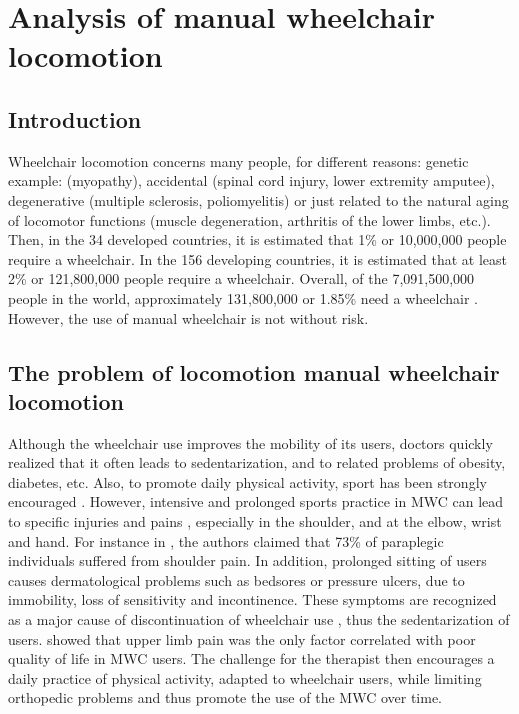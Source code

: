 \chapter[Wheelchair locomotion]{Analysis of manual wheelchair locomotion}
\label{locomotion_analysis}

\section{Introduction}
Wheelchair locomotion concerns many people, for different reasons: genetic example: (myopathy), accidental (spinal cord injury, lower extremity amputee), degenerative (multiple sclerosis, poliomyelitis) or just related to the natural aging of locomotor functions (muscle degeneration, arthritis of the lower limbs, etc.). Then, in the 34 developed countries, it is estimated that 1\% or 10,000,000 people require a wheelchair. In the 156 developing countries, it is estimated that at least 2\% or 121,800,000 people require a wheelchair. Overall, of the 7,091,500,000 people in the world, approximately 131,800,000 or 1.85\% need a wheelchair \cite{Needs2016}. However, the use of manual wheelchair is not without risk.

\section[Problem]{The problem of locomotion manual wheelchair locomotion}

Although the wheelchair use improves the mobility of its users, doctors quickly realized that it often leads to sedentarization, and to related problems of obesity, diabetes, etc. Also, to promote daily physical activity, sport has been strongly encouraged \cite{machida2013resilience}. However, intensive and prolonged sports practice in MWC can lead to specific injuries and pains \cite{johnson2004sport}, especially in the shoulder, and at the elbow, wrist and hand. For instance in \cite{pentland1991weight}, the  authors claimed that 73\%  of paraplegic individuals suffered from shoulder pain. In addition, prolonged sitting of   users causes dermatological problems such as bedsores or pressure ulcers, due to immobility, loss of sensitivity and incontinence. These symptoms are recognized as a major cause of discontinuation of wheelchair use \cite{van2006manual}  \cite{ville2006work}, thus the sedentarization of users.  \cite{lundqvist1991spinal} showed that upper limb pain was the only factor correlated with poor quality of life in MWC users. The challenge for the therapist then encourages a daily practice of physical activity, adapted to  wheelchair users, while limiting orthopedic problems and thus promote the use of the MWC over time.


